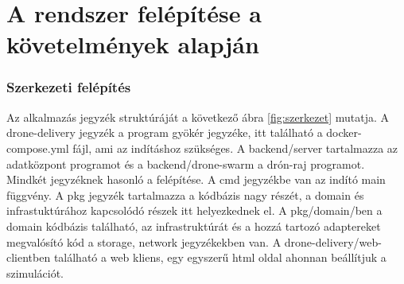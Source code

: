 \section{A rendszer felépítése a követelmények alapján}
\subsubsection{Szerkezeti felépítés}
Az alkalmazás jegyzék struktúráját a következő ábra \ref{fig:szerkezet} mutatja.
A drone-delivery jegyzék a program gyökér jegyzéke, itt található a docker-compose.yml fájl, ami az indításhoz szükséges.
A backend/server tartalmazza az adatközpont programot és a backend/drone-swarm a drón-raj programot.
Mindkét jegyzéknek hasonló a felépítése.
A cmd jegyzékbe van az indító main függvény.
A pkg jegyzék tartalmazza a kódbázis nagy részét, a domain és infrastuktúrához kapcsolódó részek itt helyezkednek el.
A pkg/domain/ben a domain kódbázis található, az infrastruktúrát és a hozzá tartozó adaptereket megvalósító kód a storage, network jegyzékekben van.
A drone-delivery/web-clientben található a web kliens, egy egyszerű html oldal ahonnan beállítjuk a szimulációt.

